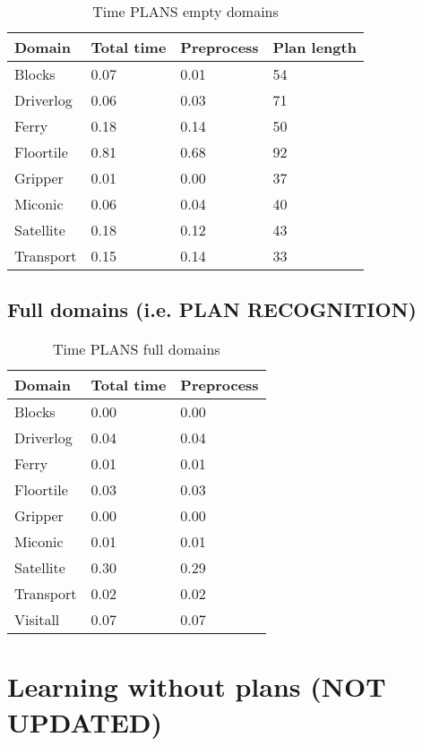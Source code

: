 \documentclass[]{article}
\begin{document}
\begin{table}[H]
	\caption{Time PLANS empty domains}
	\label{tab:time_plans_partial}
	\begin{center}
		\begin{tabular}{l|l|l|l|}			 
			Domain & Total time & Preprocess & Plan length  \\
			\hline
			Blocks & 0.07 & 0.01 & 54  \\
			Driverlog & 0.06 & 0.03 & 71 \\
			Ferry & 0.18 & 0.14 & 50 \\
			Floortile & 0.81 & 0.68 & 92 \\
			Gripper & 0.01 & 0.00 & 37 \\
			Miconic & 0.06 & 0.04 & 40  \\
			Satellite & 0.18 & 0.12 & 43 \\
			Transport & 0.15 & 0.14 & 33 \\
		\end{tabular}
	\end{center}	
\end{table}

\subsection{Full domains (i.e. PLAN RECOGNITION)}

\begin{table}[H]
	\caption{Time PLANS full domains}
	\label{tab:time_plans_full}
	\begin{center}
		\begin{tabular}{l|l|l|}			 
			Domain & Total time & Preprocess \\
			\hline
			Blocks & 0.00 & 0.00 \\
			Driverlog & 0.04 & 0.04 \\
			Ferry & 0.01 & 0.01 \\
			Floortile & 0.03 & 0.03 \\
			Gripper & 0.00 & 0.00 \\
			Miconic & 0.01 & 0.01 \\
			Satellite & 0.30 & 0.29 \\
			Transport & 0.02 & 0.02 \\
			Visitall & 0.07 & 0.07  \\
		\end{tabular}
	\end{center}	
\end{table}


\section{Learning without plans (NOT UPDATED)}
\end{document}
